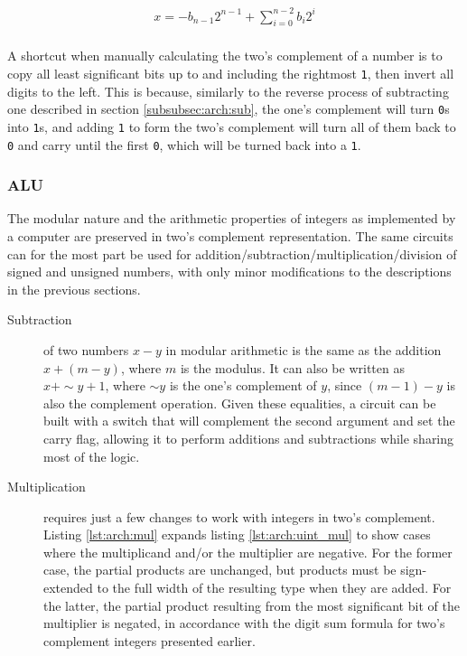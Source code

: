 \begin{align*}
    x = -b_{n-1}2^{n-1} + \sum_{i=0}^{n-2}b_i2^i \\
\end{align*}

A shortcut when manually calculating the two's complement of a number is to copy
all least significant bits up to and including the rightmost \texttt{1}, then
invert all digits to the left.  This is because, similarly to the reverse
process of subtracting one described in section \ref{subsubsec:arch:sub}, the
one's complement will turn \texttt{0}s into \texttt{1}s, and adding \texttt{1}
to form the two's complement will turn all of them back to \texttt{0} and carry
until the first \texttt{0}, which will be turned back into a \texttt{1}.

\subsubsection{ALU}

The modular nature and the arithmetic properties of integers as implemented by a
computer are preserved in two's complement representation.  The same circuits
can for the most part be used for addition/subtraction/multiplication/division
of signed and unsigned numbers, with only minor modifications to the
descriptions in the previous sections.

\begin{description}
    \item[Subtraction]
        of two numbers $x - y$ in modular arithmetic is the same as the addition
        $x + (m - y)$, where $m$ is the modulus.  It can also be written as $x +
        \sim{}y + 1$, where $\sim{}y$ is the one's complement of $y$, since $(m
        - 1) - y$ is also the complement operation.  Given these equalities, a
        circuit can be built with a switch that will complement the second
        argument and set the carry flag, allowing it to perform additions and
        subtractions while sharing most of the logic.
    \item[Multiplication]
        requires just a few changes to work with integers in two's complement.
        Listing \ref{lst:arch:mul} expands listing \ref{lst:arch:uint_mul} to
        show cases where the multiplicand and/or the multiplier are negative.
        For the former case, the partial products are unchanged, but products
        must be sign-extended to the full width of the resulting type when they
        are added.  For the latter, the partial product resulting from the most
        significant bit of the multiplier is negated, in accordance with the
        digit sum formula for two's complement integers presented earlier.
\end{description}

